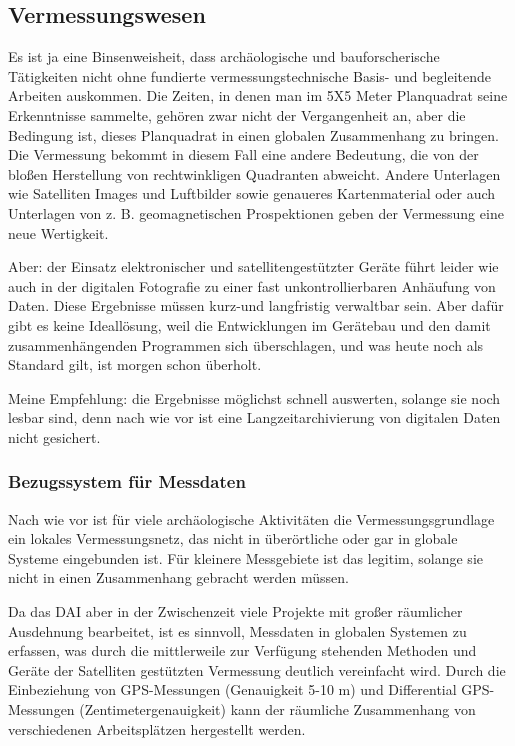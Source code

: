 \subsection*{Vermessungswesen}
Es ist ja eine Binsenweisheit, dass archäologische und bauforscherische Tätigkeiten nicht ohne fundierte vermessungstechnische Basis- und begleitende Arbeiten auskommen. Die Zeiten, in denen man im 5X5 Meter Planquadrat seine Erkenntnisse sammelte, gehören zwar nicht der Vergangenheit an, aber die Bedingung ist, dieses Planquadrat in einen globalen Zusammenhang zu bringen. Die Vermessung bekommt in diesem Fall eine andere Bedeutung, die von der bloßen Herstellung von rechtwinkligen Quadranten abweicht. Andere Unterlagen wie Satelliten Images und Luftbilder sowie genaueres Kartenmaterial oder auch Unterlagen von z. B. geomagnetischen Prospektionen geben der Vermessung eine neue Wertigkeit.

Aber: der Einsatz elektronischer und satellitengestützter Geräte führt leider wie auch in der digitalen Fotografie zu einer fast unkontrollierbaren Anhäufung von Daten. Diese Ergebnisse müssen kurz-und langfristig verwaltbar sein. Aber dafür gibt es keine Ideallösung, weil die Entwicklungen im Gerätebau und den damit zusammenhängenden Programmen sich überschlagen, und was heute noch als Standard gilt, ist morgen schon überholt.

Meine Empfehlung: die Ergebnisse möglichst schnell auswerten, solange sie noch lesbar sind, denn nach wie vor ist eine Langzeitarchivierung von digitalen Daten nicht gesichert.

\subsubsection*{Bezugssystem für Messdaten}
Nach wie vor ist für viele archäologische Aktivitäten die Vermessungsgrundlage ein lokales Vermessungsnetz, das nicht in überörtliche oder gar in globale Systeme eingebunden ist. Für kleinere Messgebiete ist das legitim, solange sie nicht in einen Zusammenhang gebracht werden müssen.

Da das DAI aber in der Zwischenzeit viele Projekte mit großer räumlicher Ausdehnung bearbeitet, ist es sinnvoll, Messdaten in globalen Systemen zu erfassen, was durch die mittlerweile zur Verfügung stehenden Methoden und Geräte der Satelliten gestützten Vermessung deutlich vereinfacht wird. Durch die Einbeziehung von GPS-Messungen (Genauigkeit 5-10 m) und Differential GPS-Messungen (Zentimetergenauigkeit) kann der räumliche Zusammenhang von verschiedenen Arbeitsplätzen hergestellt werden.

